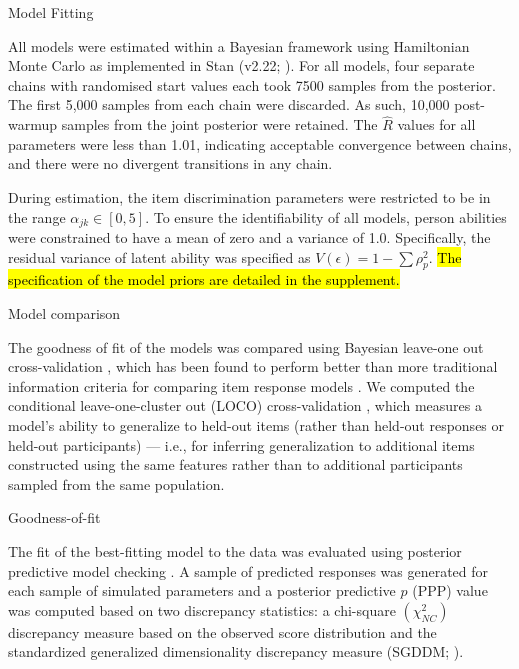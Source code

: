 \documentclass[a4paper,man,natbib,noextraspace]{apa6}
\makeatletter
\renewcommand{\subsubsection}{\@startsection{subsubsection}{3}
  {\z@}%
  {\b@level@two@skip}{\e@level@two@skip}%
  {\normalfont\normalsize\bfseries}}
\makeatother
\begin{document}
\subsubsection{Model Fitting}

All models were estimated within a Bayesian framework using Hamiltonian Monte Carlo as implemented in Stan (v2.22; \citealt{carpenter2017stan}). For all models, four separate chains with randomised start values each took 7500 samples from the posterior. The first 5,000 samples from each chain were discarded. As such, 10,000 post-warmup samples from the joint posterior were retained. The $\hat{R}$ values for all parameters were less than 1.01, indicating acceptable convergence between chains, and there were no divergent transitions in any chain. 

During estimation, the item discrimination parameters were restricted to be in the range $\alpha_{jk} \in [0, 5]$. To ensure the identifiability of all models, person abilities were constrained to have a mean of zero and a variance of 1.0. Specifically, the residual variance of latent ability was specified as $V(\epsilon) = 1 - \sum \rho_p^2$. \hl{The specification of the model priors are detailed in the supplement.}

\subsubsection{Model comparison}

The goodness of fit of the models was compared using Bayesian leave-one out cross-validation \citep{vehtari2017practical}, which has been found to perform better than more traditional information criteria for comparing item response models \citep{luo2017performances}. We computed the conditional leave-one-cluster out (LOCO) cross-validation \citep{merkle2019bayesian}, which measures a model's ability to generalize to held-out items (rather than held-out responses or held-out participants) --- i.e., for inferring generalization to additional items constructed using the same features rather than to additional participants sampled from the same population.

\subsubsection{Goodness-of-fit}

The fit of the best-fitting model to the data was evaluated using posterior predictive model checking \citep{gelman1996posterior, levy2017bayesian}. A sample of predicted responses was generated for each sample of simulated parameters and a posterior predictive $p$ (PPP) value was computed based on two discrepancy statistics: a chi-square $\left( \chi^2_{NC} \right)$ discrepancy measure based on the observed score distribution \citep{sinharay2006posterior} and the standardized generalized dimensionality discrepancy measure (SGDDM; \citealt{levy2015standardized}). 
\end{document}
